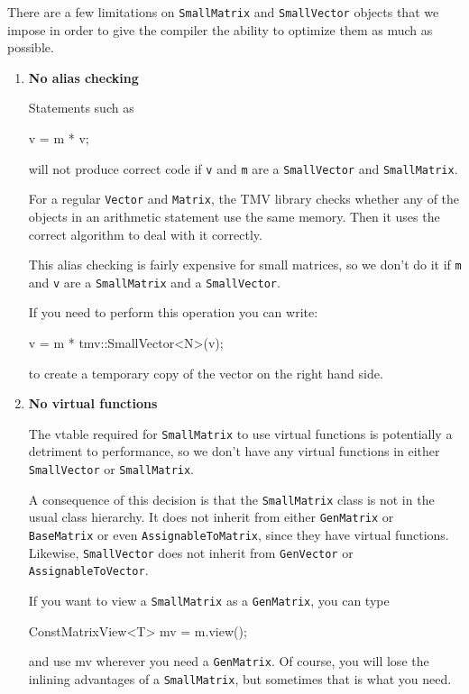 \documentclass[twoside,letterpaper,11pt]{article}
\renewcommand{\tt}[1]{{\lstinline {#1}}}
\begin{document}
There are a few limitations on \tt{SmallMatrix} and \tt{SmallVector} objects
that we impose in order to give the compiler the ability to
optimize them as much as possible.

\begin{enumerate}

\item
\textbf{No alias checking}

Statements such as 
\begin{tmvcode}
v = m * v;
\end{tmvcode}
will not produce correct code if \tt{v} and \tt{m} are a \tt{SmallVector} and \tt{SmallMatrix}.  

For a regular \tt{Vector} and \tt{Matrix}, the TMV library checks whether any of 
the objects in an arithmetic statement use the same memory.  
Then it uses the correct algorithm to deal with it 
correctly.  

This alias checking is fairly expensive for small matrices, so we don't do it if
\tt{m} and \tt{v} are a \tt{SmallMatrix} and a \tt{SmallVector}.  

If you need to perform this operation you can write:
\begin{tmvcode}
v = m * tmv::SmallVector<N>(v);
\end{tmvcode}
to create a temporary copy of the vector on the right hand side. 

\item
\textbf{No virtual functions}

The vtable required for \tt{SmallMatrix} to use virtual functions is potentially a 
detriment to performance, so we don't have any virtual functions in either \tt{SmallVector}
or \tt{SmallMatrix}. 

A consequence of this decision is that the \tt{SmallMatrix} class is not in the usual
class hierarchy.  It
does not inherit from either \tt{GenMatrix} or \tt{BaseMatrix} or even \tt{AssignableToMatrix}, 
since they have virtual functions.  
Likewise, \tt{SmallVector} does not inherit from \tt{GenVector} or \tt{AssignableToVector}.

If you want to view a \tt{SmallMatrix} as a \tt{GenMatrix}, you can type
\begin{tmvcode}
ConstMatrixView<T> mv = m.view();
\end{tmvcode}
and use mv wherever you need a \tt{GenMatrix}.  Of course, you will lose the 
inlining advantages of a \tt{SmallMatrix}, but sometimes that is what you need.


\end{enumerate}
\end{document}
